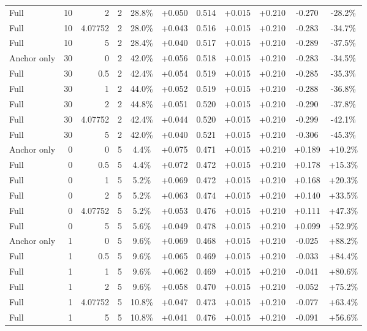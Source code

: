 \begin{table}[htbp]
\begin{tabular}{lrrrccccccc}
Full & 10 & 2 & 2 & 28.8\% & +0.050 & 0.514 & +0.015 & +0.210 & -0.270 & -28.2\% \\
Full & 10 & 4.07752 & 2 & 28.0\% & +0.043 & 0.516 & +0.015 & +0.210 & -0.283 & -34.7\% \\
Full & 10 & 5 & 2 & 28.4\% & +0.040 & 0.517 & +0.015 & +0.210 & -0.289 & -37.5\% \\
Anchor only & 30 & 0 & 2 & 42.0\% & +0.056 & 0.518 & +0.015 & +0.210 & -0.283 & -34.5\% \\
Full & 30 & 0.5 & 2 & 42.4\% & +0.054 & 0.519 & +0.015 & +0.210 & -0.285 & -35.3\% \\
Full & 30 & 1 & 2 & 44.0\% & +0.052 & 0.519 & +0.015 & +0.210 & -0.288 & -36.8\% \\
Full & 30 & 2 & 2 & 44.8\% & +0.051 & 0.520 & +0.015 & +0.210 & -0.290 & -37.8\% \\
Full & 30 & 4.07752 & 2 & 42.4\% & +0.044 & 0.520 & +0.015 & +0.210 & -0.299 & -42.1\% \\
Full & 30 & 5 & 2 & 42.0\% & +0.040 & 0.521 & +0.015 & +0.210 & -0.306 & -45.3\% \\
Anchor only & 0 & 0 & 5 & 4.4\% & +0.075 & 0.471 & +0.015 & +0.210 & +0.189 & +10.2\% \\
Full & 0 & 0.5 & 5 & 4.4\% & +0.072 & 0.472 & +0.015 & +0.210 & +0.178 & +15.3\% \\
Full & 0 & 1 & 5 & 5.2\% & +0.069 & 0.472 & +0.015 & +0.210 & +0.168 & +20.3\% \\
Full & 0 & 2 & 5 & 5.2\% & +0.063 & 0.474 & +0.015 & +0.210 & +0.140 & +33.5\% \\
Full & 0 & 4.07752 & 5 & 5.2\% & +0.053 & 0.476 & +0.015 & +0.210 & +0.111 & +47.3\% \\
Full & 0 & 5 & 5 & 5.6\% & +0.049 & 0.478 & +0.015 & +0.210 & +0.099 & +52.9\% \\
Anchor only & 1 & 0 & 5 & 9.6\% & +0.069 & 0.468 & +0.015 & +0.210 & -0.025 & +88.2\% \\
Full & 1 & 0.5 & 5 & 9.6\% & +0.065 & 0.469 & +0.015 & +0.210 & -0.033 & +84.4\% \\
Full & 1 & 1 & 5 & 9.6\% & +0.062 & 0.469 & +0.015 & +0.210 & -0.041 & +80.6\% \\
Full & 1 & 2 & 5 & 9.6\% & +0.058 & 0.470 & +0.015 & +0.210 & -0.052 & +75.2\% \\
Full & 1 & 4.07752 & 5 & 10.8\% & +0.047 & 0.473 & +0.015 & +0.210 & -0.077 & +63.4\% \\
Full & 1 & 5 & 5 & 10.8\% & +0.041 & 0.476 & +0.015 & +0.210 & -0.091 & +56.6\% \\

\end{tabular}
\end{table}
